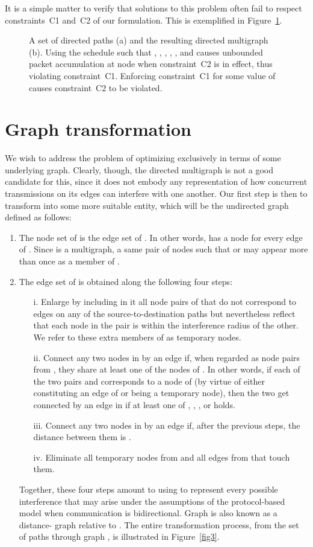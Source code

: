 \documentclass{article}
\begin{document}
It is a simple matter to verify that solutions to this problem often fail to
respect constraints~C1 and~C2 of our formulation. This is exemplified in
Figure~\ref{fig2}.

\begin{figure}[t]
\centering
{}
\caption{A set of  directed paths (a) and the resulting directed multigraph
 (b). Using the schedule  such that ,
, , , , and  causes
unbounded packet accumulation at node  when constraint~C2 is in effect, thus
violating constraint~C1. Enforcing constraint~C1 for some value of  causes
constraint~C2 to be violated.}
\label{fig2}
\end{figure}

\section{Graph transformation}\label{sec:transf}

We wish to address the problem of optimizing  exclusively in
terms of some underlying graph. Clearly, though, the directed multigraph  is
not a good candidate for this, since it does not embody any representation of
how concurrent transmissions on its edges can interfere with one another. Our
first step is then to transform  into some more suitable entity, which will
be the undirected graph  defined as follows:
\begin{enumerate}
\item The node set  of  is the edge set  of . In other words, 
has a node for every edge of . Since  is a multigraph, a same pair of
nodes  such that  or  may appear more than
once as a member of .
\item The edge set  of  is obtained along the following four steps:
\begin{enumerate}
\item[i.] Enlarge  by including in it all node pairs of  that do not
correspond to edges on any of the  source-to-destination paths but
nevertheless reflect that each node in the pair is within the interference
radius of the other. We refer to these extra members of  as temporary nodes.
\item[ii.] Connect any two nodes in  by an edge if, when regarded as node
pairs from , they share at least one of the nodes of . In other words, if
each of the two pairs  and  corresponds to a node of  (by
virtue of either constituting an edge of  or being a temporary node), then
the two get connected by an edge in  if at least one of , , ,
or  holds.
\item[iii.] Connect any two nodes in  by an edge if, after the previous
steps, the distance between them is .
\item[iv.] Eliminate all temporary nodes from  and all edges from  that
touch them.
\end{enumerate}
Together, these four steps amount to using  to represent every possible
interference that may arise under the assumptions of the protocol-based model
when communication is bidirectional. Graph  is also known as a distance-
graph relative to  \cite{bbkmt04}. The entire transformation process, from
the set of  paths through graph , is illustrated in Figure~\ref{fig3}.
\end{enumerate}
\end{document}
